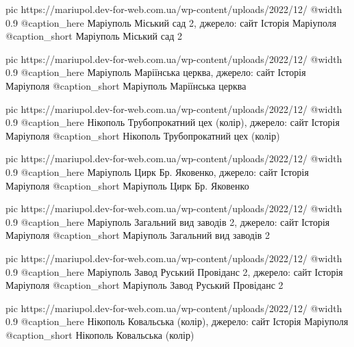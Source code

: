 	pic https://mariupol.dev-for-web.com.ua/wp-content/uploads/2022/12/%
	@width 0.9
	@caption_here Маріуполь Міський сад 2, джерело: сайт Історія Маріуполя
	@caption_short Маріуполь Міський сад 2

	pic https://mariupol.dev-for-web.com.ua/wp-content/uploads/2022/12/%
	@width 0.9
	@caption_here Маріуполь Маріїнська церква, джерело: сайт Історія Маріуполя
	@caption_short Маріуполь Маріїнська церква

	pic https://mariupol.dev-for-web.com.ua/wp-content/uploads/2022/12/%
	@width 0.9
	@caption_here Нікополь Трубопрокатний цех (колір), джерело: сайт Історія Маріуполя
	@caption_short Нікополь Трубопрокатний цех (колір)

	pic https://mariupol.dev-for-web.com.ua/wp-content/uploads/2022/12/%
	@width 0.9
	@caption_here Маріуполь Цирк Бр. Яковенко, джерело: сайт Історія Маріуполя
	@caption_short Маріуполь Цирк Бр. Яковенко

	pic https://mariupol.dev-for-web.com.ua/wp-content/uploads/2022/12/%
	@width 0.9
	@caption_here Маріуполь Загальний вид заводів 2, джерело: сайт Історія Маріуполя
	@caption_short Маріуполь Загальний вид заводів 2

	pic https://mariupol.dev-for-web.com.ua/wp-content/uploads/2022/12/%
	@width 0.9
	@caption_here Маріуполь Завод Руський Провіданс 2, джерело: сайт Історія Маріуполя
	@caption_short Маріуполь Завод Руський Провіданс 2

	pic https://mariupol.dev-for-web.com.ua/wp-content/uploads/2022/12/%
	@width 0.9
	@caption_here Нікополь Ковальська (колір), джерело: сайт Історія Маріуполя
	@caption_short Нікополь Ковальська (колір)

